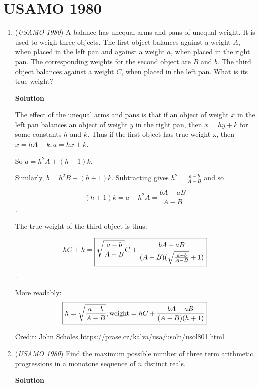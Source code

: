 \section{USAMO 1980}
        \begin{enumerate}
        	\item (\textit{USAMO 1980}) A balance has unequal arms and pans of unequal weight. It is used to weigh three objects. The first object balances against a weight $A$, when placed in the left pan and against a weight $a$, when placed in the right pan. The corresponding weights for the second object are $B$ and $b$. The third object balances against a weight $C$, when placed in the left pan. What is its true weight?


 



\textbf{Solution}

The effect of the unequal arms and pans is that if an object of weight $x$ in the left pan balances an object of weight $y$ in the right pan, then $x = hy + k$ for some constants $h$ and $k$. Thus if the first object has true weight x, then $x = hA + k, a = hx +  k$. 

 So $a = h^2A + (h+1)k$. 

 Similarly, $b = h^2B + (h+1)k$. Subtracting gives $h^2 = \frac{a-b}{A-B}$ and so

 
 \[(h+1)k = a - h^2A = \frac{bA - aB}{A - B}\].

 The true weight of the third object is thus:

 
 \[hC + k = \\ \boxed{\sqrt{ \frac{a-b}{A-B}} C + \frac{bA - aB}{(A - B)(\sqrt{ \frac {a-b}{A-B}}+ 1)}}\].

 More readably: 
 \[\boxed{ h=\sqrt{\frac{a-b}{A-B}} ;  \\ \text{weight} = hC + \frac{bA - aB}{(A - B)(h + 1)}}\]

 Credit: John Scholes \href{https://prase.cz/kalva/usa/usoln/usol801.html}{https://prase.cz/kalva/usa/usoln/usol801.html}

 


	\item (\textit{USAMO 1980}) Find the maximum possible number of three term arithmetic progressions in a monotone sequence of $n$ distinct reals.


 



\textbf{Solution}


\end{enumerate}
